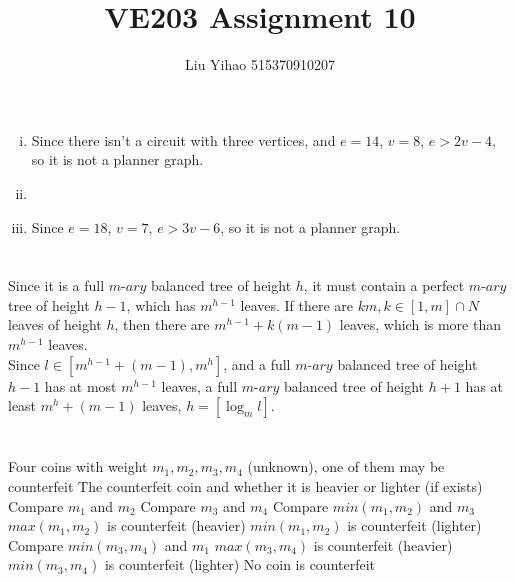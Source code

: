 \documentclass{article}
\title{VE203 Assignment 10}
\author{Liu Yihao 515370910207}
\date{}
\begin{document}
\maketitle

\section{}
\begin{enumerate}[i)]
\item
Since there isn't a circuit with three vertices, and $e=14$, $v=8$, $e>2v-4$, so it is not a planner graph.
\item \ 
\begin{center}
\end{center}
\item
Since $e=18$, $v=7$, $e>3v-6$, so it is not a planner graph.
\end{enumerate}

\section{}
Since it is a full $m$-$ary$ balanced tree of height $h$, it must contain a perfect 
$m$-$ary$ tree of height $h-1$, which has $m^{h-1}$ leaves. If there are $km,k\in[1,m]\cap N$ leaves of height $h$, then there are $m^{h-1}+k(m-1)$ leaves, which is more than $m^{h-1}$ leaves.\\
Since $l\in[m^{h-1}+(m-1),m^h]$, and a full $m$-$ary$ balanced tree of height $h-1$
has at most $m^{h-1}$ leaves, a full $m$-$ary$ balanced tree of height $h+1$
has at least $m^h+(m-1)$ leaves, $h=[\log_ml]$.

\section{}
\begin{algorithm}
\begin{algorithmic}[1]
	\Require Four coins with weight $m_1,m_2,m_3,m_4$ (unknown), one of them may be counterfeit
	\Ensure The counterfeit coin and whether it is heavier or lighter (if exists)
	\State Compare $m_1$ and $m_2$
	\State Compare $m_3$ and $m_4$
		\State Compare $min(m_1,m_2)$ and $m_3$
			\State $max(m_1,m_2)$ is counterfeit (heavier)
		\Else
			\State $min(m_1,m_2)$ is counterfeit (lighter)
		\EndIf
		\State Compare $min(m_3,m_4)$ and $m_1$
			\State $max(m_3,m_4)$ is counterfeit (heavier)
		\Else
			\State $min(m_3,m_4)$ is counterfeit (lighter)
		\EndIf
	\Else
		\State No coin is counterfeit
	\EndIf
\end{algorithmic}
\end{algorithm}
\end{document}
